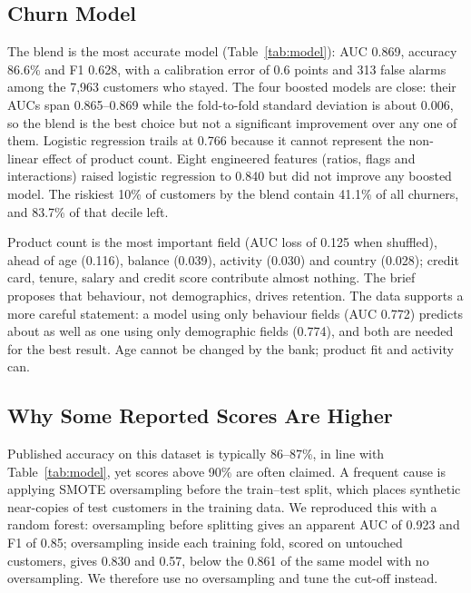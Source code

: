 \documentclass[10pt,twocolumn,letterpaper]{article}
\begin{document}
\subsection{Churn Model}
The blend is the most accurate model (Table~\ref{tab:model}): AUC 0.869, accuracy 86.6\% and F1 0.628, with a calibration error of 0.6 points and 313 false alarms among the 7,963 customers who stayed. The four boosted models are close: their AUCs span 0.865--0.869 while the fold-to-fold standard deviation is about 0.006, so the blend is the best choice but not a significant improvement over any one of them. Logistic regression trails at 0.766 because it cannot represent the non-linear effect of product count. Eight engineered features (ratios, flags and interactions) raised logistic regression to 0.840 but did not improve any boosted model. The riskiest 10\% of customers by the blend contain 41.1\% of all churners, and 83.7\% of that decile left.

Product count is the most important field (AUC loss of 0.125 when shuffled), ahead of age (0.116), balance (0.039), activity (0.030) and country (0.028); credit card, tenure, salary and credit score contribute almost nothing. The brief proposes that behaviour, not demographics, drives retention. The data supports a more careful statement: a model using only behaviour fields (AUC 0.772) predicts about as well as one using only demographic fields (0.774), and both are needed for the best result. Age cannot be changed by the bank; product fit and activity can.

\subsection{Why Some Reported Scores Are Higher}
Published accuracy on this dataset is typically 86--87\%, in line with Table~\ref{tab:model}, yet scores above 90\% are often claimed. A frequent cause is applying SMOTE oversampling \cite{smote} before the train--test split, which places synthetic near-copies of test customers in the training data. We reproduced this with a random forest: oversampling before splitting gives an apparent AUC of 0.923 and F1 of 0.85; oversampling inside each training fold, scored on untouched customers, gives 0.830 and 0.57, below the 0.861 of the same model with no oversampling. We therefore use no oversampling and tune the cut-off instead.
\end{document}
